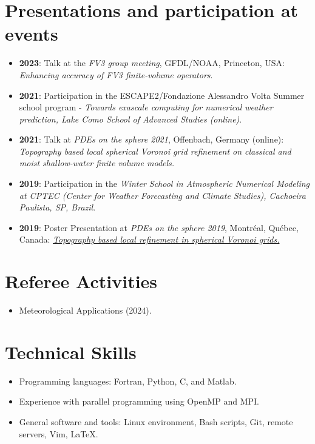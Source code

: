 \documentclass[letterpaper,11pt]{article}
\begin{document}
\section{Presentations and participation at events}
\begin{itemize}
	\item \textbf{2023}: Talk at the \textit{FV3 group meeting}, 
	GFDL/NOAA, Princeton, USA: \textit{Enhancing accuracy of FV3 finite-volume operators}.
	\item \textbf{2021}: Participation in the
    ESCAPE2/Fondazione Alessandro Volta  Summer school program -
    \textit{Towards exascale computing
	for numerical weather prediction, Lake Como School of Advanced Studies (online)}.
	\item \textbf{2021}: Talk at \textit{PDEs on the sphere 2021}, Offenbach, Germany (online): \textit{Topography based local spherical Voronoi grid refinement on classical and moist shallow-water finite volume models.} 
	\item \textbf{2019}: Participation in the \textit{Winter School in Atmospheric Numerical Modeling at CPTEC (Center for Weather Forecasting and Climate Studies), Cachoeira Paulista, SP, Brazil}.
	\item \textbf{2019}: Poster Presentation at \textit{PDEs on the sphere 2019}, Montréal, Québec, Canada:
	\textit{\href{https://collaboration.cmc.ec.gc.ca/science/pdes-2019/pdfs/poster-Luan-Santos.pdf}{Topography based local refinement in spherical Voronoi grids.}}
\end{itemize}

 

\section{Referee Activities}
\begin{itemize}
	\item Meteorological Applications (2024).
\end{itemize}
%
\section{Technical Skills}
\begin{itemize}
	\item Programming languages: Fortran, Python, C, and Matlab.
	\item Experience with parallel programming using OpenMP and MPI.
	\item General software and tools: Linux environment, Bash scripts, Git, remote servers, Vim, \LaTeX.
\end{itemize}
\end{document}
